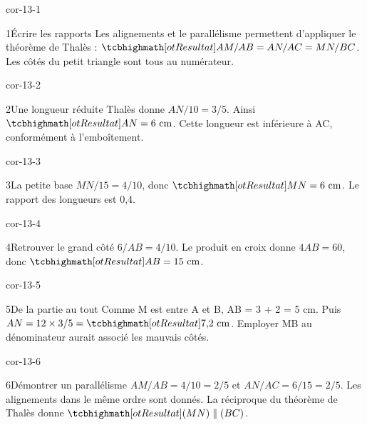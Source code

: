 \clearpage\pagestyle{otMain}\fontsize{11}{15}\selectfont{}
\begin{blocLivre}{cor-13-1}\begin{corrige}{1}{Écrire les rapports}
Les alignements et le parallélisme permettent d’appliquer le théorème de Thalès : $\res{AM/AB=AN/AC=MN/BC}$. Les côtés du petit triangle sont tous au numérateur.
\label{fig-cor-13-1}
\end{corrige}\end{blocLivre}
\begin{blocLivre}{cor-13-2}\begin{corrige}{2}{Une longueur réduite}
Thalès donne $AN/10=3/5$. Ainsi $\res{AN=6\text{ cm}}$. Cette longueur est inférieure à AC, conformément à l’emboîtement.
\label{fig-cor-13-2}
\end{corrige}\end{blocLivre}
\begin{blocLivre}{cor-13-3}\begin{corrige}{3}{La petite base}
$MN/15=4/10$, donc $\res{MN=6\text{ cm}}$. Le rapport des longueurs est 0,4.
\label{fig-cor-13-3}
\end{corrige}\end{blocLivre}
\begin{blocLivre}{cor-13-4}\begin{corrige}{4}{Retrouver le grand côté}
$6/AB=4/10$. Le produit en croix donne $4AB=60$, donc $\res{AB=15\text{ cm}}$.
\label{fig-cor-13-4}
\end{corrige}\end{blocLivre}
\begin{blocLivre}{cor-13-5}\begin{corrige}{5}{De la partie au tout}
Comme M est entre A et B, AB = 3 + 2 = 5 cm. Puis $AN=12\times3/5=\res{7{,}2\text{ cm}}$. Employer MB au dénominateur aurait associé les mauvais côtés.
\label{fig-cor-13-5}
\end{corrige}\end{blocLivre}
\begin{blocLivre}{cor-13-6}\begin{corrige}{6}{Démontrer un parallélisme}
$AM/AB=4/10=2/5$ et $AN/AC=6/15=2/5$. Les alignements dans le même ordre sont donnés. La réciproque du théorème de Thalès donne $\res{(MN)\parallel(BC)}$.
\label{fig-cor-13-6}
\end{corrige}\end{blocLivre}
